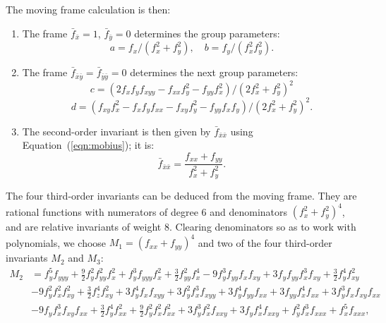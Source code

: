 \documentclass[review,onefignum,onetabnum]{siamonline190516}
\begin{document}
The moving frame calculation is then:
\begin{enumerate}
\item The frame $\bar f_{\bar x}=1$, $\bar f_{\bar y}=0$ determines the group parameters:
$$ a = f_x/(f_x^2 + f_y^2),\quad b = f_y/(f_x^2 f_y^2).$$

\item The frame $\bar f_{\bar x \bar y}=\bar f_{\bar y \bar y}=0$ determines the next group parameters:
$$ c = (2 f_xf_yf_{xyy} - f_{xx}f_y^2 - f_{yy}f_x^2)/(2 f_x^2 + f_y^2)^2$$
$$ d = (f_{xy}f_x^2 - f_x f_y f_{xx} - f_{xy}f_y^2 - f_{yy} f_x f_y)/(2 f_x^2 + f_y^2)^2.$$

\item The second-order invariant is then given by $\bar f_{\bar x \bar x}$ using Equation~(\ref{eqn:mobius}); it is:
$$\bar f_{\bar x \bar x} = \frac{f_{xx}+f_{yy}}{f_x^2 + f_y^2}.$$
\end{enumerate}


The four third-order invariants can be deduced from the moving frame. They
are rational functions with numerators of degree 6 and denominators $(f_x^2
+ f_y^2)^4$, and are relative invariants of weight 8.  Clearing
denominators so as to work with polynomials, we choose $M_1 = (f_{xx} +
f_{yy})^4$ and two of the four third-order invariants $M_2$ and $M_3$:
\begin{align*} M_2&=
f_y ^5 f_{yyy} + \frac{9}{2} f_y ^2 f_{yy}^2 f_x ^2 + 
 f_y ^3 f_{yyy} f_x ^2 + \frac{3}{2} f_{yy}^2 f_x ^4 - 
 9 f_y ^3 f_{yy} f_x  f_{xy} + 
 3 f_y  f_{yy} f_x ^3 f_{xy} + \frac{3}{2} f_y ^4 f_{xy}^2 \\ \nonumber
 &- 9 f_y ^2 f_x ^2 f_{xy}^2 
+ \frac{3}{2} f_z ^4 f_{xy}^2 + 
 3 f_y ^4 f_x  f_{xyy} + 3 f_y ^2 f_x ^3 f_{xyy} + 
 3 f_y ^4 f_{yy} f_{xx} + 3 f_{yy} f_x ^4 f_{xx} + 
 3 f_y ^3 f_x  f_{xy} f_{xx} \\ \nonumber
&- 9 f_y  f_x ^3 f_{xy} f_{xx} 
+ \frac{3}{2} f_y ^4 f_{xx}^2 + 
 \frac{9}{2} f_y ^2 f_x ^2 f_{xx}^2 + 3 f_y ^3 f_x ^2 f_{xxy} + 
 3 f_y  f_x ^4 f_{xxy} + f_y ^2 f_x ^3 f_{xxx} + 
 f_x ^5 f_{xxx}, 
\end{align*}
 
\end{document}
